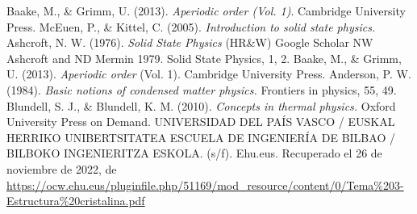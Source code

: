 \nocite{*}
%
%

\begin{thebibliography}{00}
 Baake, M., \& Grimm, U. (2013). \textit{Aperiodic order (Vol. 1)}. Cambridge University Press.
 McEuen, P., \& Kittel, C. (2005). \textit{Introduction to solid state physics.}
 Ashcroft, N. W. (1976). \textit{Solid State Physics} (HR\&W) Google Scholar NW Ashcroft and ND Mermin 1979. Solid State Physics, 1, 2.
 Baake, M., \& Grimm, U. (2013). \textit{Aperiodic order} (Vol. 1). Cambridge University Press.
 Anderson, P. W. (1984). \textit{Basic notions of condensed matter physics.} Frontiers in physics, 55, 49.
 Blundell, S. J., \& Blundell, K. M. (2010). \textit{Concepts in thermal physics.} Oxford University Press on Demand.
 UNIVERSIDAD DEL PAÍS VASCO / EUSKAL HERRIKO UNIBERTSITATEA ESCUELA DE INGENIERÍA DE BILBAO / BILBOKO INGENIERITZA ESKOLA. (s/f). Ehu.eus. Recuperado el 26 de noviembre de 2022, de \url{https://ocw.ehu.eus/pluginfile.php/51169/mod_resource/content/0/Tema\%203-Estructura\%20cristalina.pdf}


\end{thebibliography}






